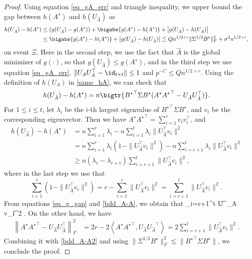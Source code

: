 \documentclass[aos,preprint]{imsart}
\begin{document}
\begin{proof}%
	Using equation \eqref{eq_gA_err} and triangle inequality, we upper bound the gap between $h(A^{\star})$ and $h(U_{\hat{A}})$ as
	\begin{align}
		h(U_{\hat{A}})- h(A^{\star})   &\le (g(U_{\hat{A}}) - g({A}^{\star})) + \bigabs{g(A^{\star}) - h(A^{\star})} +  \big|g(U_{\hat{A}}) - h(U_{\hat{A}})\big| \nonumber \\
		&\le \bigabs{g(A^{\star}) - h(A^{\star})}  + \big|g(U_{\hat{A}}) - h(U_{\hat{A}})\big|  \lesssim Q n^{1/2+c} \|\Sigma^{1/2} B^{\star}\|_F^2 +  \sigma^2 n^{ 1/2+c}   ,\label{eq_g_gap}
	\end{align}
	on event $\Xi$.
	Here in the second step, we use the fact that $\hat A$ is the global minimizer of $g(\cdot)$, so that $g(U_{\hat{A}}) \le g({A}^\star)$, and in the third step we use equation \eqref{eq_gA_err},  $\|U_A U_A^{\top} - \id_{t\times t}\|\le 1$ and $p^{-C}\le Qn^{1/2+c}$. 
	Using the definition of $h(U_A)$ in \eqref{same_hA}, we can check that
	$$h(U_{\hat{A}})-h(A^\star) = n \bigtr{{B^\star}^\top\Sigma B^\star ( A^\star {A^\star}^\top -U_{\hat A}U^\top_{\hat A})} .$$
	For $1\le i \le t$, let $\lambda_i $ be the $i$-th largest eigenvalue of ${B^\star}^\top\Sigma B^\star$, and $v_i$ be the corresponding eigenvector.
	Then we have $A^\star {A^\star}^\top =\sum_{i=1}^r v_i v_i^\top$, and
	\begin{align}
	 h(U_{\hat{A}})-h(A^\star) & = n \sum_{i=1}^r \lambda_i - n\sum_{i=1}^t \lambda_i \| U^\top_{\hat A} v_i\|^2  \nonumber\\
	&= n\sum_{i=1}^r \lambda_i\left(1 -  \| U^\top_{\hat A} v_i\|^2\right)-n\sum_{i=r+1}^t \lambda_i \| U^\top_{\hat A} v_i\|^2 \nonumber\\
	& \ge  n(\lambda_r-\lambda_{r+1}) \sum_{i=r+1}^t \| U^\top_{\hat A} v_i\|^2 , \label{bdd_A-A}
	\end{align}
	where in the last step we use that
	$$\sum_{i=1}^r \left(1 -  \| U^\top_{\hat A} v_i\|^2\right) = r- \sum_{i=1}^r  \| U^\top_{\hat A} v_i\|^2 =\sum_{i=r+1}^t \| U^\top_{\hat A} v_i\|^2  .$$
	From equations \eqref{eq_g_gap} and  \eqref{bdd_A-A}, we obtain that
	\be\label{bdd_A-A2} \sum_{i=r+1}^t \| U^\top_{\hat A} v_i\|^2 \lesssim {}  .\ee
	On the other hand, we have
	\begin{align*}
	\left\| A^\star {A^\star}^\top -U_{\hat A}U^\top_{\hat A}\right\|_F^2
	&= 2r - 2\left\langle A^{\star}{A^{\star}}^{\top}, U_{\hat{A}} {U_{\hat{A}}}^{\top}\right\rangle = 2 \sum_{i=r+1}^t \| U^\top_{\hat A} v_i\|^2.
	\end{align*}
	Combining it with \eqref{bdd_A-A2} and using $\|\Sigma^{1/2} B^{\star}\|_F^2\lesssim  \|{B^{\star}}^\top\Sigma B^{\star}\| $, we conclude the proof.
	\end{proof}
	
\end{document}
